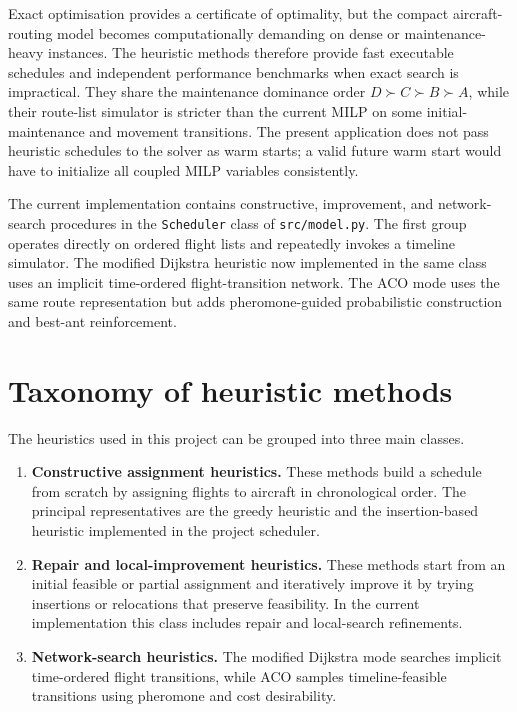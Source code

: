 Exact optimisation provides a certificate of optimality, but the compact
aircraft-routing model becomes computationally demanding on dense or
maintenance-heavy instances. The heuristic methods therefore provide fast
executable schedules and independent performance benchmarks when exact search
is impractical. They share the maintenance dominance order
$D \succ C \succ B \succ A$, while their route-list simulator is stricter than
the current MILP on some initial-maintenance and movement transitions. The
present application does not pass heuristic schedules to the solver as warm
starts; a valid future warm start would have to initialize all coupled MILP
variables consistently.

The current implementation contains constructive, improvement, and network-search procedures in the \texttt{Scheduler} class of \texttt{src/model.py}. The first group operates directly on ordered flight lists and repeatedly invokes a timeline simulator. The modified Dijkstra heuristic now implemented in the same class uses an implicit time-ordered flight-transition network. The ACO mode uses the same route representation but adds pheromone-guided probabilistic construction and best-ant reinforcement.

\section{Taxonomy of heuristic methods}
\label{sec:heuristic_taxonomy}

The heuristics used in this project can be grouped into three main classes.

\begin{enumerate}
    \item \textbf{Constructive assignment heuristics.} These methods build a schedule from scratch by assigning flights to aircraft in chronological order. The principal representatives are the greedy heuristic and the insertion-based heuristic implemented in the project scheduler.
    \item \textbf{Repair and local-improvement heuristics.} These methods start from an initial feasible or partial assignment and iteratively improve it by trying insertions or relocations that preserve feasibility. In the current implementation this class includes repair and local-search refinements.
    \item \textbf{Network-search heuristics.} The modified Dijkstra mode searches implicit time-ordered flight transitions, while ACO samples timeline-feasible transitions using pheromone and cost desirability.
\end{enumerate}

